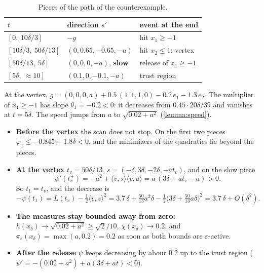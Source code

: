 \documentclass[11pt,a4paper]{article}
\numberwithin{equation}{section}
\theoremstyle{plain}
\newtheorem{proposition}[theorem]{Proposition}
\theoremstyle{definition}
\theoremstyle{remark}
\newcommand{\inner}[2]{\langle #1,#2\rangle}
\begin{document}
\begin{table}[ht]
\centering
\caption{Pieces of the path of the counterexample.}\label{tab:path}
\begin{tabular}{lll}
\toprule
$t$ & direction $s'$ & event at the end \\
\midrule
$[0,\ 10\delta/3]$ & $-g$ & hit $x_1\ge-1$ \\
$[10\delta/3,\ 50\delta/13]$ & $(0,0.65,-0.65,-a)$ & hit $x_2\le1$: vertex \\
$[50\delta/13,\ 5\delta]$ & $(0,0,0,-a)$, \textbf{slow} & release of $x_1\ge-1$ \\
$[5\delta,\ \approx10]$ & $(0.1,0,-0.1,-a)$ & trust region \\
\bottomrule
\end{tabular}
\end{table}

At the vertex, $g=(0,0,0,a)+0.5\,(1,1,1,0)-0.2\,e_1-1.3\,e_2$. The multiplier of $x_1\ge-1$
has slope $\theta_1=-0.2<0$: it decreases from $0.45\cdot20\delta/39$ and vanishes at
$t=5\delta$. The speed jumps from $a$ to $\sqrt{0.02+a^2}$ (\cref{lemma:speed}).
\begin{itemize}
\item \textbf{Before the vertex} the scan does not stop. On the first two pieces
  $\varphi_1\le-0.845+1.8\delta<0$, and the minimizers of the quadratics lie beyond the pieces.
\item \textbf{At the vertex} $t_v=50\delta/13$, $s=(-\delta,3\delta,-2\delta,-at_v)$, and on
  the slow piece
  \[
    \psi'(t_v^+)=-a^2+\inner{v}{s}\inner{v}{d}=a\,(3\delta+at_v-a)>0.
  \]
  So $t_1=t_v$, and the decrease is
  \[
    -\psi(t_1)=L(t_v)-\tfrac12\inner{v}{s}^2
    =3.7\,\delta+\tfrac{50}{13}a^2\delta-\tfrac12\big(3\delta+\tfrac{50}{13}a\delta\big)^2
    =3.7\,\delta+O(\delta^2).
  \]
\item \textbf{The measures stay bounded away from zero:} $h(x_\delta)\to\sqrt{0.02+a^2}\ge\sqrt2/10$,
  $\chi(x_\delta)\to0.2$, and $\pi_\varepsilon(x_\delta)=\max(a,0.2)=0.2$ as soon as both
  bounds are $\varepsilon$-active.
\item \textbf{After the release} $\psi$ keeps decreasing by about $0.2$ up to the trust region
  ($\psi'=-(0.02+a^2)+a(3\delta+at)<0$).
\end{itemize}

\end{document}
